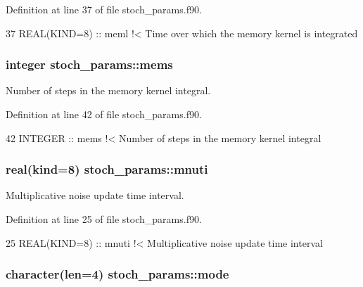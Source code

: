 Definition at line 37 of file stoch\+\_\+params.\+f90.


\begin{DoxyCode}
37   \textcolor{keywordtype}{REAL(KIND=8)} :: meml\textcolor{comment}{               !< Time over which the memory kernel is integrated}
\end{DoxyCode}
\subsubsection[{\texorpdfstring{mems}{mems}}]{\setlength{\rightskip}{0pt plus 5cm}integer stoch\+\_\+params\+::mems}\hypertarget{namespacestoch__params_a1e5a5dc39327df54fe21be20d06cea47}{}\label{namespacestoch__params_a1e5a5dc39327df54fe21be20d06cea47}


Number of steps in the memory kernel integral. 



Definition at line 42 of file stoch\+\_\+params.\+f90.


\begin{DoxyCode}
42   \textcolor{keywordtype}{INTEGER} :: mems\textcolor{comment}{                    !< Number of steps in the memory kernel integral}
\end{DoxyCode}
\subsubsection[{\texorpdfstring{mnuti}{mnuti}}]{\setlength{\rightskip}{0pt plus 5cm}real(kind=8) stoch\+\_\+params\+::mnuti}\hypertarget{namespacestoch__params_ab0b8df90daf320dc4f5810eacd7d93e7}{}\label{namespacestoch__params_ab0b8df90daf320dc4f5810eacd7d93e7}


Multiplicative noise update time interval. 



Definition at line 25 of file stoch\+\_\+params.\+f90.


\begin{DoxyCode}
25   \textcolor{keywordtype}{REAL(KIND=8)} :: mnuti\textcolor{comment}{              !< Multiplicative noise update time interval}
\end{DoxyCode}
\subsubsection[{\texorpdfstring{mode}{mode}}]{\setlength{\rightskip}{0pt plus 5cm}character(len=4) stoch\+\_\+params\+::mode}\hypertarget{namespacestoch__params_a2c3f6439fd2d66413d065b533f2a6263}{}\label{namespacestoch__params_a2c3f6439fd2d66413d065b533f2a6263}


